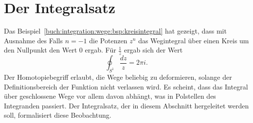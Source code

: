 %
%
%
\section{Der Integralsatz
\label{buch:integration:section:cauchy}}
Das Beispiel~\ref{buch:integration:wege:bsp:kreisintegral} hat
gezeigt, dass mit Ausnahme des Falls $n=-1$ die Potenzen $z^n$ 
das Wegintegral über einen Kreis um den Nullpunkt den Wert 0
ergab.
Für $\frac{1}{z}$ ergab sich der Wert
\[
\oint_{S^1} \frac{dz}{z}
=
2\pi i.
\]
Der Homotopiebegriff erlaubt, die Wege beliebig zu deformieren,
solange der Definitionsbereich der Funktion nicht verlassen wird.
Es scheint, dass das Integral über geschlossene Wege vor allem davon
abhängt, was in Polstellen des Integranden passiert.
Der Integralsatz, der in diesem Abschnitt hergeleitet werden soll,
formalisiert diese Beobachtung.







